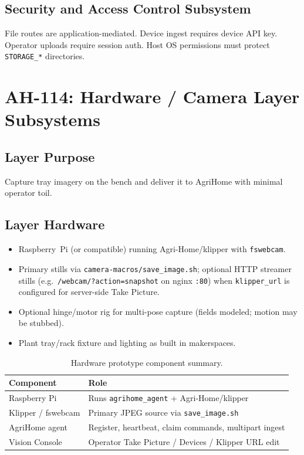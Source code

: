 \documentclass[11pt,letterpaper]{article}
\begin{document}
\subsection{Security and Access Control Subsystem}
File routes are application-mediated. Device ingest requires device API key. Operator uploads
require session auth. Host OS permissions must protect \texttt{STORAGE\_*} directories.

\section{AH-114: Hardware / Camera Layer Subsystems}

\subsection{Layer Purpose}
Capture tray imagery on the bench and deliver it to AgriHome with minimal operator toil.

\subsection{Layer Hardware}
\begin{itemize}
  \item Raspberry~Pi (or compatible) running Agri-Home/klipper with \texttt{fswebcam}.
  \item Primary stills via \texttt{camera-macros/save\_image.sh}; optional HTTP streamer
        stills (e.g.\ \texttt{/webcam/?action=snapshot} on nginx \texttt{:80}) when
        \texttt{klipper\_url} is configured for server-side Take Picture.
  \item Optional hinge/motor rig for multi-pose capture (fields modeled; motion may be stubbed).
  \item Plant tray/rack fixture and lighting as built in makerspaces.
\end{itemize}

\begin{table}[H]
\centering
\begin{tabular}{@{}p{4.2cm}p{9.5cm}@{}}
\toprule
\textbf{Component} & \textbf{Role} \\
\midrule
Raspberry Pi & Runs \texttt{agrihome\_agent} + Agri-Home/klipper \\
Klipper / fswebcam & Primary JPEG source via \texttt{save\_image.sh} \\
AgriHome agent & Register, heartbeat, claim commands, multipart ingest \\
Vision Console & Operator Take Picture / Devices / Klipper URL edit \\
\bottomrule
\end{tabular}
\caption{Hardware prototype component summary.}
\label{tab:hw}
\end{table}
\end{document}
